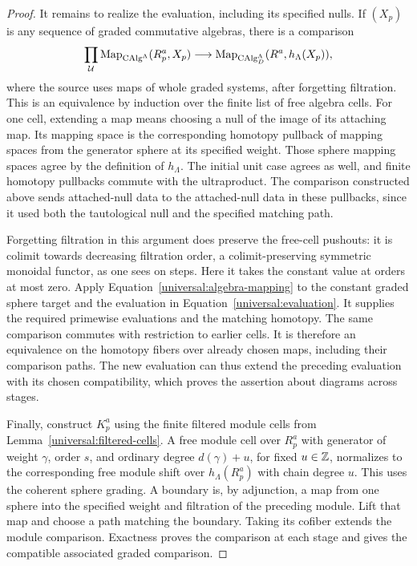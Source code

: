 \begin{proof}
It remains to realize the evaluation, including its specified
nulls. If $(X_p)$ is any sequence of graded commutative
algebras, there is a comparison
\begin{equation}\label{universal:algebra-mapping}
 \prod_{\mathcal U}\operatorname{Map}_{\mathrm{CAlg}^\Lambda}(R_p^a,X_p)
 \longrightarrow
 \operatorname{Map}_{\mathrm{CAlg}_D^\Lambda}(R^a,h_\Lambda(X_p)),
\end{equation}
where the source uses maps of whole graded systems, after
forgetting filtration. This is an equivalence by induction
over the finite list of free algebra cells. For one cell,
extending a map means choosing a null of the image of its
attaching map. Its mapping space is the corresponding
homotopy pullback of mapping spaces from the generator
sphere at its specified weight. Those sphere mapping
spaces agree by the definition of $h_\Lambda$. The initial
unit case agrees as well, and finite homotopy pullbacks
commute with the ultraproduct. The comparison constructed
above sends attached-null data to the attached-null data
in these pullbacks, since it used both the tautological
null and the specified matching path.

Forgetting filtration in this argument does preserve the
free-cell pushouts: it is colimit towards decreasing
filtration order, a colimit-preserving symmetric monoidal
functor, as one sees on steps. Here it takes the constant
value at orders at most zero. Apply
Equation~\eqref{universal:algebra-mapping} to the constant
graded sphere target and the evaluation in
Equation~\eqref{universal:evaluation}. It supplies the
required primewise evaluations and the matching homotopy.
The same comparison commutes with restriction to earlier
cells. It is therefore an equivalence on the homotopy fibers
over already chosen maps, including their comparison paths.
The new evaluation can thus extend the preceding evaluation
with its chosen compatibility, which proves the assertion
about diagrams across stages.

Finally, construct $K_p^a$ using the finite filtered module
cells from Lemma~\ref{universal:filtered-cells}. A free module
cell over $R_p^a$ with generator of weight $\gamma$, order
$s$, and ordinary degree $d(\gamma)+u$, for fixed $u\in\mathbb Z$,
normalizes to the corresponding free module shift over
$h_\Lambda(R_p^a)$ with chain degree $u$. This uses the
coherent sphere grading. A boundary is, by adjunction, a
map from one sphere into the specified weight and
filtration of the preceding module. Lift that map and
choose a path matching the boundary. Taking its cofiber
extends the module comparison. Exactness proves the
comparison at each stage and gives the compatible
associated graded comparison.
\end{proof}

